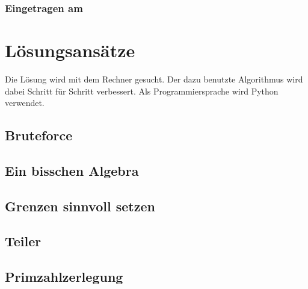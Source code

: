\documentclass[10pt, fleqn]{article}
\begin{document}
\subsubsection*{Eingetragen am}

\newpage

\section{Lösungsansätze}
Die Lösung wird mit dem Rechner gesucht. Der dazu benutzte Algorithmus wird 
dabei Schritt für Schritt verbessert. Als Programmiersprache wird Python 
verwendet. 

\subsection{Bruteforce}

\subsection{Ein bisschen Algebra}

\subsection{Grenzen sinnvoll setzen}

\subsection{Teiler}

\subsection{Primzahlzerlegung}
\end{document}
